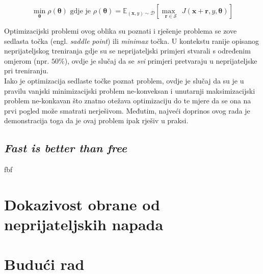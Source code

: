 \documentclass[utf8, diplomski]{fer}
\begin{document}
\begin{equation}
\underset{\boldsymbol{\theta}}{\min}\rho(\boldsymbol{\theta}) \text{ gdje je } \rho  (\boldsymbol{\theta}) = \mathbb{E}_{(\boldsymbol{x}, y) \sim \mathcal{D}}[\underset{\boldsymbol{r} \in \mathcal{S}}{\max\text{ }} J(\boldsymbol{x} + \boldsymbol{r}, y, \boldsymbol{\theta})]
\end{equation}

Optimizacijski problemi ovog oblika su poznati i rješenje problema se zove sedlasta točka (engl. \textit{saddle point}) ili \textit{minimax} točka. U kontekstu ranije opisanog neprijateljskog treniranja gdje su se neprijateljski primjeri stvarali s određenim omjerom (npr. $50\%$), ovdje je slučaj da se \textit{svi} primjeri pretvaraju u neprijateljske pri treniranju. \\
Iako je optimizacija sedlaste točke poznat problem, ovdje je slučaj da su je u pravilu vanjski minimizacijski problem ne-konveksan i unutarnji maksimizacijski problem ne-konkavan što znatno otežava optimizaciju do te mjere da se ona na prvi pogled može smatrati nerješivom. Međutim, najveći doprinos ovog rada je demonstracija toga da je ovaj problem ipak rješiv u praksi. 


\subsection{\textit{Fast is better than free}}
fbf\citep{fbf}
\section{Dokazivost obrane od neprijateljskih napada}
\section{Budući rad}
\end{document}
